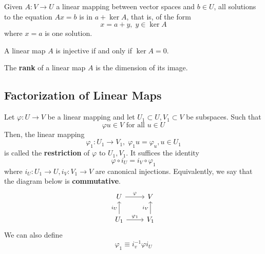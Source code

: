   \begin{theorem}
    Given $A: V \longrightarrow U$ a linear mapping between vector spaces and $b \in U$, all solutions to the equation $Ax = b$ is in $a + \ker A$, that is, of the form 
    \begin{equation}
      x = a + y, \; y \in \ker A
    \end{equation}
    where $x = a$ is one solution. 
  \end{theorem}

  \begin{corollary}
    A linear map $A$ is injective if and only if $\ker A = 0$.
  \end{corollary}

  \begin{definition}[Rank]
    The \textbf{rank} of a linear map $A$ is the dimension of its image. 
  \end{definition}

\subsection{Factorization of Linear Maps}

  \begin{definition}[Restriction]
    Let $\varphi: U \longrightarrow V$ be a linear mapping and let $U_1 \subset U, V_1 \subset V$ be subspaces. Such that 
    \begin{equation}
      \varphi u \in V \text{ for all } u \in U
    \end{equation}
    Then, the linear mapping 
    \begin{equation}
      \varphi_1: U_1 \longrightarrow V_1, \; \varphi_1 u = \varphi_u, u \in U_1
    \end{equation}
    is called the \textbf{restriction} of $\varphi$ to $U_1, V_1$. It suffices the identity
    \begin{equation}
      \varphi \circ i_U = i_V \circ \varphi_1
    \end{equation}
    where $i_U: U_1 \longrightarrow U, i_V: V_1 \longrightarrow V$ are canonical injections. Equivalently, we say that the diagram below is \textbf{commutative}. 
    \[
      \begin{tikzcd}
        U \arrow{r}{\varphi} & V \\
        U_1 \arrow{u}{i_U} \arrow{r}{\varphi_1} & V_1 \arrow{u}{i_V}
      \end{tikzcd}
    \]
    We can also define 
    \begin{equation}
      \varphi_1 \equiv i_v^{-1} \varphi i_U
    \end{equation}
  \end{definition}

